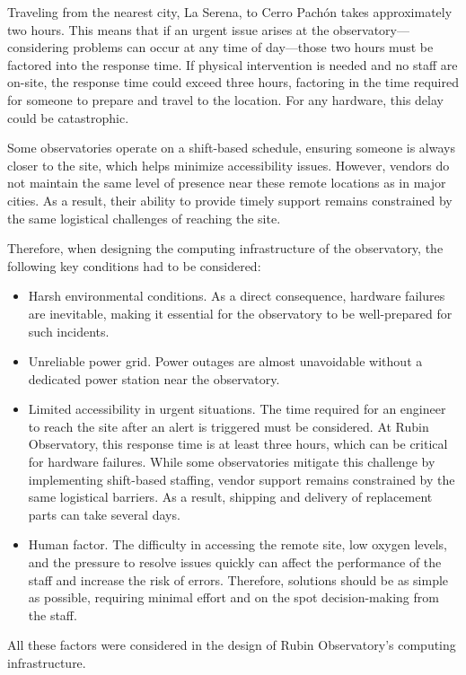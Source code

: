 Traveling from the nearest city, La Serena, to Cerro Pachón takes approximately two hours. This means that if an urgent issue arises at the observatory—considering problems can occur at any time of day—those two hours must be factored into the response time. If physical intervention is needed and no staff are on-site, the response time could exceed three hours, factoring in the time required for someone to prepare and travel to the location. For any hardware, this delay could be catastrophic.

Some observatories operate on a shift-based schedule, ensuring someone is always closer to the site, which helps minimize accessibility issues. However, vendors do not maintain the same level of presence near these remote locations as in major cities. As a result, their ability to provide timely support remains constrained by the same logistical challenges of reaching the site.

Therefore, when designing the computing infrastructure of the observatory, the following key conditions had to be considered:

\begin {itemize}
\item Harsh environmental conditions. As a direct consequence, hardware failures are inevitable, making it essential for the observatory to be well-prepared for such incidents.
\item Unreliable power grid. Power outages are almost unavoidable without a dedicated power station near the observatory.
\item Limited accessibility in urgent situations. The time required for an engineer to reach the site after an alert is triggered must be considered. At Rubin Observatory, this response time is at least three hours, which can be critical for hardware failures. While some observatories mitigate this challenge by implementing shift-based staffing, vendor support remains constrained by the same logistical barriers. As a result, shipping and delivery of replacement parts can take several days.
\item Human factor. The difficulty in accessing the remote site, low oxygen levels, and the pressure to resolve issues quickly can affect the performance of the staff and increase the risk of errors. Therefore, solutions should be as simple as possible, requiring minimal effort and on the spot decision-making from the staff.
\end {itemize}

All these factors were considered in the design of Rubin Observatory's computing infrastructure.

